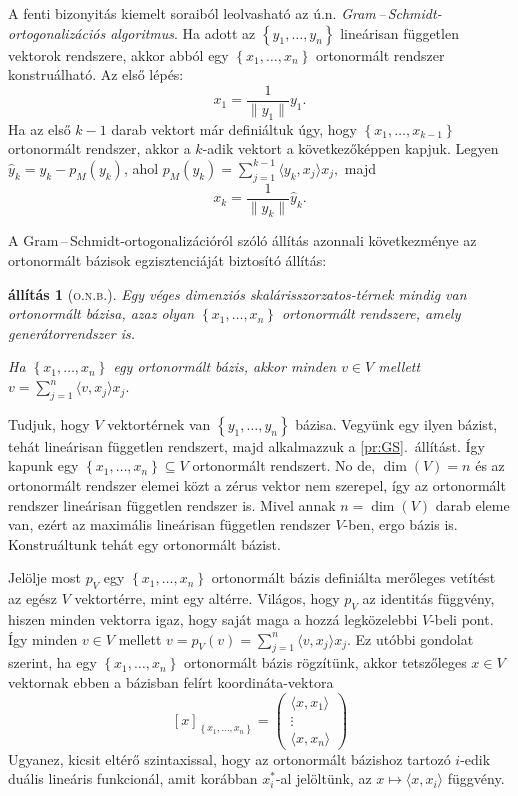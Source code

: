 \documentclass[a4paper, showtrims]{memoir}
\makeatletter
\renewenvironment{proof}[1][\proofname]
    {\par\pushQED{\qed}%
    \normalfont \topsep6\p@\@plus6\p@\relax
    \trivlist
    \item[\hskip\labelsep
        \itshape
    #1\@addpunct{:}]\ignorespaces}
    {\popQED\endtrivlist\@endpefalse}
\theoremstyle{plain}
\newtheorem{proposition}{állítás}[chapter]
\theoremstyle{remark}
\theoremstyle{definition}
\newcommand{\ip}[2]{\langle#1,#2\rangle}
\makeatother
\begin{document}
A fenti bizonyitás kiemelt soraiból leolvasható az ú.n. \emph{Gram\,--\,Schmidt-ortogonalizációs algoritmus}.
Ha adott az $\left\{ y_1,\ldots,y_n \right\}$ lineárisan független vektorok rendszere, akkor abból egy
$\left\{ x_1,\ldots,x_n \right\}$ ortonormált rendszer konstruálható.
Az első lépés:
\[
	x_1=\frac{1}{\|y_1\|}y_1.
\]
Ha az első $k-1$ darab vektort már definiáltuk úgy, hogy $\left\{ x_1,\ldots,x_{k-1} \right\}$ ortonormált rendszer,
akkor a $k$-adik vektort a következőképpen kapjuk.
Legyen $\hat{y}_k=y_k-p_M\left( y_k \right)$,
ahol
$p_M\left( y_k \right)=\sum_{j=1}^{k-1}\ip{y_k}{x_j}x_j,$
majd
\[
	x_k=\frac{1}{\|\hat{y}_k\|}\hat{y}_k.
\]

A Gram\,--\,Schmidt-ortogonalizációról szóló állítás azonnali következménye az ortonormált bázisok egzisztenciáját biztosító állítás:
\begin{proposition}[\textsc{o.n.b.}]\label{pr:onb}
	Egy véges dimenziós skalárisszorzatos-térnek mindig van ortonormált bázisa, azaz olyan $\left\{ x_1,\ldots,x_n \right\}$ ortonormált
	rendszere, amely generátorrendszer is.

	Ha $\left\{ x_1,\ldots,x_n \right\}$ egy ortonormált bázis, akkor minden $v\in V$ mellett
	\(
	v=
	\sum_{j=1}^n\ip{v}{x_j}x_j.
	\)
\end{proposition}
\begin{proof}
	Tudjuk, hogy $V$ vektortérnek van $\left\{ y_1,\ldots,y_n \right\}$ bázisa.
	Vegyünk egy ilyen bázist, tehát lineárisan független rendszert, majd alkalmazzuk a \ref{pr:GS}.~állítást.
	Így kapunk egy
	\begin{math}
		\left\{ x_1,\ldots,x_n \right\}\subseteq V
	\end{math}
	ortonormált rendszert.
	No de, $\dim(V)=n$ és az ortonormált rendszer elemei közt a zérus vektor nem szerepel,
	így az ortonormált rendszer lineárisan független rendszer is.
	Mivel annak $n=\dim(V)$ darab eleme van,
	ezért az maximális lineárisan független rendszer $V$-ben, ergo bázis is.
	Konstruáltunk tehát egy ortonormált bázist.

	Jelölje most $p_V$ egy $\left\{ x_1,\ldots,x_n \right\}$
	ortonormált bázis definiálta merőleges vetítést az egész $V$ vektortérre, mint egy altérre.
	Világos, hogy $p_V$ az identitás függvény,
	hiszen minden vektorra igaz, hogy saját maga a hozzá legközelebbi $V$-beli pont.
	Így minden $v\in V$ mellett $v=p_V\left( v \right)=\sum_{j=1}^n\ip{v}{x_j}x_j.$
\end{proof}
Ez utóbbi gondolat szerint,
ha egy $\left\{ x_1,\ldots,x_n \right\}$ ortonormált bázis rögzítünk,
akkor tetszőleges $x\in V$ vektornak ebben a bázisban felírt koordináta-vektora
\[
	[x]_{\left\{x_1,\ldots,x_n\right\}}
	=
	\begin{pmatrix}
		\ip{x}{x_1} \\ \vdots \\\ip{x}{x_n}
	\end{pmatrix}
\]
Ugyanez, kicsit eltérő szintaxissal, hogy az ortonormált bázishoz tartozó
$i$-edik duális lineáris funkcionál,
amit korábban $x_i^\ast$-al jelöltünk, az $x\mapsto\ip{x}{x_i}$
függvény.
\end{document}
